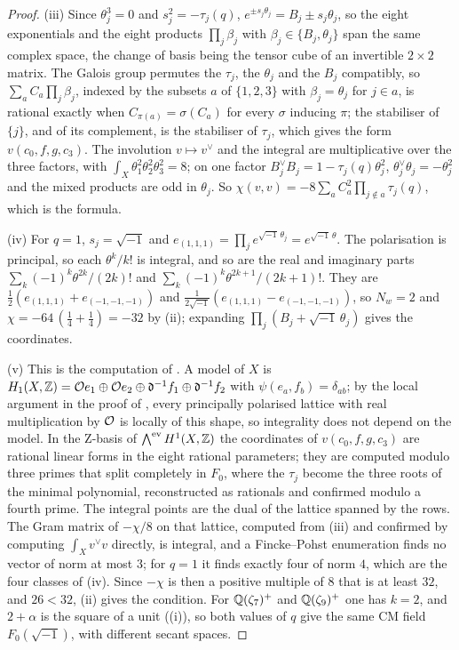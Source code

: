 \begin{proof}
(iii) Since $\theta_{j}^{3}=0$ and $s_{j}^{2}=-\tau_{j}(q)$,
$e^{\pm s_{j}\theta_{j}}=B_{j}\pm s_{j}\theta_{j}$, so the eight exponentials
and the eight products $\prod_{j}\beta_{j}$ with $\beta_{j}\in\{B_{j},\theta_{j}\}$
span the same complex space, the change of basis being the tensor cube of an
invertible $2\times2$ matrix. The Galois group permutes the $\tau_{j}$, the
$\theta_{j}$ and the $B_{j}$ compatibly, so $\sum_{a}C_{a}\prod_{j}\beta_{j}$,
indexed by the subsets $a$ of $\{1,2,3\}$ with $\beta_{j}=\theta_{j}$ for
$j\in a$, is rational exactly when $C_{\pi(a)}=\sigma(C_{a})$ for every
$\sigma$ inducing $\pi$; the stabiliser of $\{j\}$, and of its complement,
is the stabiliser of $\tau_{j}$, which gives the form $v(c_{0},f,g,c_{3})$.
The involution $v\mapsto v^{\vee}$ and the integral are multiplicative over
the three factors, with $\int_{X}\theta_{1}^{2}\theta_{2}^{2}\theta_{3}^{2}=8$;
on one factor $B_{j}^{\vee}B_{j}=1-\tau_{j}(q)\theta_{j}^{2}$,
$\theta_{j}^{\vee}\theta_{j}=-\theta_{j}^{2}$ and the mixed products are odd
in $\theta_{j}$. So
$\chi(v,v)=-8\sum_{a}C_{a}^{2}\prod_{j\notin a}\tau_{j}(q)$, which is the
formula.

(iv) For $q=1$, $s_{j}=\sqrt{-1}$ and $e_{(1,1,1)}=\prod_{j}e^{\sqrt{-1}\,
\theta_{j}}=e^{\sqrt{-1}\,\theta}$. The polarisation is principal, so each
$\theta^{k}/k!$ is integral, and so are the real and imaginary parts
$\sum_{k}(-1)^{k}\theta^{2k}/(2k)!$ and $\sum_{k}(-1)^{k}\theta^{2k+1}/(2k+1)!$.
They are $\tfrac12(e_{(1,1,1)}+e_{(-1,-1,-1)})$ and
$\tfrac1{2\sqrt{-1}}(e_{(1,1,1)}-e_{(-1,-1,-1)})$, so $N_{w}=2$ and
$\chi=-64\,(\tfrac14+\tfrac14)=-32$ by (ii); expanding
$\prod_{j}(B_{j}+\sqrt{-1}\,\theta_{j})$ gives the coordinates.

(v) This is the computation of \cite{BMB26}. A model of $X$ is
$H_{1}(X,\mathbb{Z})=\mathcal{O} e_{1}\oplus\mathcal{O} e_{2}\oplus\mathfrak d^{-1}f_{1}\oplus
\mathfrak d^{-1}f_{2}$ with $\psi(e_{a},f_{b})=\delta_{ab}$; by the local
argument in the proof of , every principally
polarised lattice with real multiplication by $\mathcal{O}$ is locally of this shape,
so integrality does not depend on the model. In the Z-basis of
$\bigwedge^{\mathrm{ev}}H^{1}(X,\mathbb{Z})$ the coordinates of
$v(c_{0},f,g,c_{3})$ are rational linear forms in the eight rational
parameters; they are computed modulo three primes that split completely in
$F_{0}$, where the $\tau_{j}$ become the three roots of the minimal polynomial,
reconstructed as rationals and confirmed modulo a fourth prime. The integral
points are the dual of the lattice spanned by the rows. The Gram matrix of
$-\chi/8$ on that lattice, computed from (iii) and confirmed by computing
$\int_{X}v^{\vee}v$ directly, is integral, and a Fincke--Pohst enumeration
finds no vector of norm at most $3$; for $q=1$ it finds exactly four of norm
$4$, which are the four classes of (iv). Since $-\chi$ is then a positive
multiple of $8$ that is at least $32$, and $26<32$, (ii) gives the condition.
For $\mathbb{Q}(\zeta_{7})^{+}$ and $\mathbb{Q}(\zeta_{9})^{+}$ one has $k=2$, and $2+\alpha$
is the square of a unit ((i)), so both values of $q$
give the same CM field $F_{0}(\sqrt{-1})$, with different secant spaces.
\end{proof}


